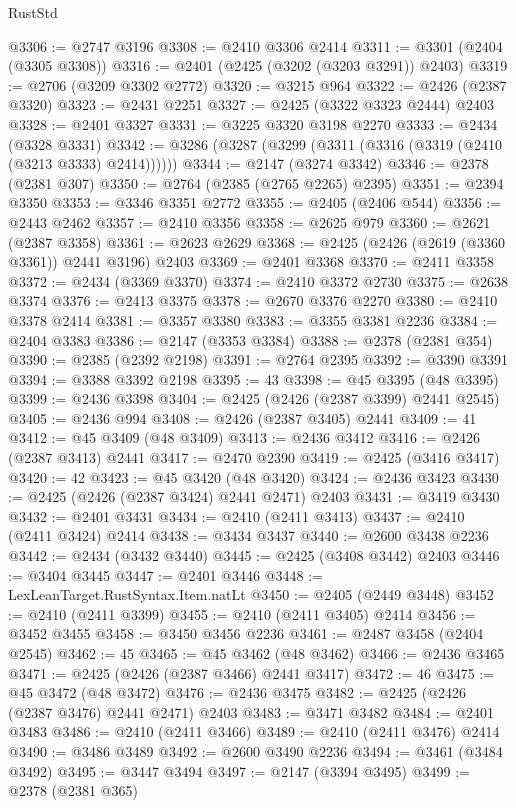 \begin{lexlean}{RustStd}
\begin{coremodule}
@3306 := @2747 @3196
@3308 := @2410 @3306 @2414
@3311 := @3301 (@2404 (@3305 @3308))
@3316 := @2401 (@2425 (@3202 (@3203 @3291)) @2403)
@3319 := @2706 (@3209 @3302 @2772)
@3320 := @3215 @964
@3322 := @2426 (@2387 @3320)
@3323 := @2431 @2251
@3327 := @2425 (@3322 @3323 @2444) @2403
@3328 := @2401 @3327
@3331 := @3225 @3320 @3198 @2270
@3333 := @2434 (@3328 @3331)
@3342 := @3286 (@3287 (@3299 (@3311 (@3316 (@3319 (@2410 (@3213 @3333) @2414))))))
@3344 := @2147 (@3274 @3342)
@3346 := @2378 (@2381 @307)
@3350 := @2764 (@2385 (@2765 @2265) @2395)
@3351 := @2394 @3350
@3353 := @3346 @3351 @2772
@3355 := @2405 (@2406 @544)
@3356 := @2443 @2462
@3357 := @2410 @3356
@3358 := @2625 @979
@3360 := @2621 (@2387 @3358)
@3361 := @2623 @2629
@3368 := @2425 (@2426 (@2619 (@3360 @3361)) @2441 @3196) @2403
@3369 := @2401 @3368
@3370 := @2411 @3358
@3372 := @2434 (@3369 @3370)
@3374 := @2410 @3372 @2730
@3375 := @2638 @3374
@3376 := @2413 @3375
@3378 := @2670 @3376 @2270
@3380 := @2410 @3378 @2414
@3381 := @3357 @3380
@3383 := @3355 @3381 @2236
@3384 := @2404 @3383
@3386 := @2147 (@3353 @3384)
@3388 := @2378 (@2381 @354)
@3390 := @2385 (@2392 @2198)
@3391 := @2764 @2395
@3392 := @3390 @3391
@3394 := @3388 @3392 @2198
@3395 := 43
@3398 := @45 @3395 (@48 @3395)
@3399 := @2436 @3398
@3404 := @2425 (@2426 (@2387 @3399) @2441 @2545)
@3405 := @2436 @994
@3408 := @2426 (@2387 @3405) @2441
@3409 := 41
@3412 := @45 @3409 (@48 @3409)
@3413 := @2436 @3412
@3416 := @2426 (@2387 @3413) @2441
@3417 := @2470 @2390
@3419 := @2425 (@3416 @3417)
@3420 := 42
@3423 := @45 @3420 (@48 @3420)
@3424 := @2436 @3423
@3430 := @2425 (@2426 (@2387 @3424) @2441 @2471) @2403
@3431 := @3419 @3430
@3432 := @2401 @3431
@3434 := @2410 (@2411 @3413)
@3437 := @2410 (@2411 @3424) @2414
@3438 := @3434 @3437
@3440 := @2600 @3438 @2236
@3442 := @2434 (@3432 @3440)
@3445 := @2425 (@3408 @3442) @2403
@3446 := @3404 @3445
@3447 := @2401 @3446
@3448 := LexLeanTarget.RustSyntax.Item.natLt
@3450 := @2405 (@2449 @3448)
@3452 := @2410 (@2411 @3399)
@3455 := @2410 (@2411 @3405) @2414
@3456 := @3452 @3455
@3458 := @3450 @3456 @2236
@3461 := @2487 @3458 (@2404 @2545)
@3462 := 45
@3465 := @45 @3462 (@48 @3462)
@3466 := @2436 @3465
@3471 := @2425 (@2426 (@2387 @3466) @2441 @3417)
@3472 := 46
@3475 := @45 @3472 (@48 @3472)
@3476 := @2436 @3475
@3482 := @2425 (@2426 (@2387 @3476) @2441 @2471) @2403
@3483 := @3471 @3482
@3484 := @2401 @3483
@3486 := @2410 (@2411 @3466)
@3489 := @2410 (@2411 @3476) @2414
@3490 := @3486 @3489
@3492 := @2600 @3490 @2236
@3494 := @3461 (@3484 @3492)
@3495 := @3447 @3494
@3497 := @2147 (@3394 @3495)
@3499 := @2378 (@2381 @365)

\end{coremodule}
\end{lexlean}
